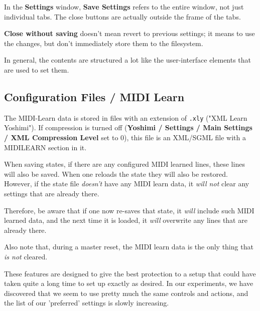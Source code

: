    In the \textbf{Settings} window, \textbf{Save Settings}
   refers to the entire window, not just individual tabs. The close buttons are
   actually outside the frame of the tabs.

   \textbf{Close without saving} doesn't mean revert to previous settings; it
   means to use the changes, but don't immediately store them to the
   filesystem.

   In general, the contents are structured a lot like the
   user-interface elements that are used to set them.

\subsection{Configuration Files / MIDI Learn}
\label{subsec:configuration_file_midi_learn}

   The MIDI-Learn data is stored in files with an extension of 
   \texttt{.xly} ("XML Learn Yoshimi").
   If compression is turned off
   (\textbf{Yoshimi / Settings / Main Settings / XML Compression Level} set to
   0), this file is an XML/SGML file with a MIDILEARN section in it.

   When saving states, if there are any configured MIDI learned lines,
   these lines will also be saved.
   When one reloads the state they will also be restored.
   However, if the state file \textsl{doesn't} have any MIDI learn data,
   it \textsl{will not} clear any settings that are already there.

   Therefore, be aware that if one now re-saves that state, it \textsl{will}
   include such MIDI learned data, and the next time it is loaded,
   it \textsl{will} overwrite any lines that are already there.

   Also note that, during a master reset, the MIDI learn data is the only thing
   that \textsl{is not} cleared.

   These features are designed to give the best protection to a setup
   that could have taken quite a
   long time to set up exactly as desired.  In our experiments, we have
   discovered that we seem to use pretty much the same controls and actions,
   and the list of our 'preferred' settings is slowly increasing.

